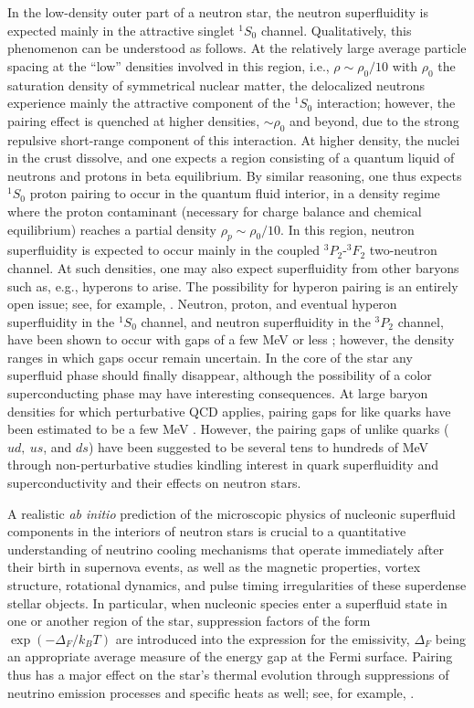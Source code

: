 \documentclass[preprint,rmp,aps,floatfix]{revtex4}
\begin{document}
In the low-density outer part of a neutron star, 
the neutron superfluidity is expected 
mainly in the attractive singlet $^1S_0$ channel. 
Qualitatively, this phenomenon can be understood
as follows.  At the relatively large average particle spacing at the 
``low'' densities involved in this region, i.e., $\rho \sim \rho_0/10$ 
with  $\rho_0$ the saturation density 
of symmetrical nuclear matter, 
the delocalized neutrons experience mainly the attractive component 
of the $^1S_0$ interaction;  however, the pairing effect is quenched 
at higher densities, $\sim \rho_0$ and beyond, due to the strong 
repulsive short-range component of this interaction.  
At higher density, the nuclei in the crust dissolve, and one 
expects a region consisting of a quantum liquid of neutrons and 
protons in beta equilibrium. 
By similar reasoning, one 
thus expects $^1S_0$ proton pairing to occur in the quantum fluid interior, 
in a density regime where the proton contaminant (necessary for
charge balance and chemical equilibrium) reaches a partial 
density $\rho_p \sim \rho_0/10$. 
In this region, neutron superfluidity is expected to  
occur mainly in the coupled $^3P_2$-$^3F_2$ two-neutron channel. 
At such densities, one may also expect superfluidity from 
other baryons such as, e.g., 
hyperons to arise. The possibility for hyperon pairing is an entirely open
issue; see, for example, \cite{barnea1996}.
Neutron, proton, and eventual hyperon superfluidity in the $^1S_0$
channel, and neutron  superfluidity in the $^3P_2$ channel, have been shown
to occur with gaps of a few MeV or less \cite{pair2};
however, the density ranges in which gaps occur remain
uncertain. 
In the core of the star any superfluid 
phase should finally disappear, although the possibility of a
color superconducting phase may have interesting consequences.
At large baryon densities for which perturbative QCD
applies, pairing gaps for like quarks have been estimated to be a few
MeV \cite{bailin84}.  However, the pairing gaps of unlike quarks ($ud,~
us$, and $ds$) have been suggested to be several tens to
hundreds of MeV through non-perturbative studies \cite{qsf0}
kindling interest in quark superfluidity and superconductivity
\cite{qsf} and their effects on
neutron stars.

A realistic {\it ab initio} prediction of the 
microscopic physics of nucleonic superfluid components in the interiors 
of neutron stars is crucial to a quantitative understanding of neutrino 
cooling mechanisms \cite{cooling1,cooling2,cooling3,nstar} 
that operate immediately after their birth 
in supernova events, as well as the magnetic properties, vortex structure, 
rotational dynamics, and pulse timing irregularities of these 
superdense stellar objects.  
In particular, when nucleonic species enter 
a superfluid state in one or another region of the star, suppression 
factors of the form $\exp (-\Delta_F /k_B T)$ are introduced 
into the expression for the emissivity, $\Delta_F$ being an appropriate 
average measure of the energy gap at the Fermi surface.  
Pairing thus has a major effect on the
star's thermal evolution through suppressions of neutrino
emission processes and specific heats as well; see, for example,
\cite{page2000}.  
\end{document}
